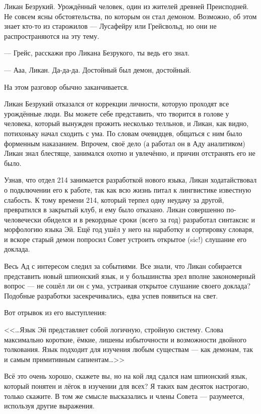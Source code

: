 \documentclass[a4paper,10pt]{book}
\begin{document}
Ликан Безрукий. Урождённый человек, один из жителей древней Преисподней. Не 
совсем ясны обстоятельства, по которым он стал демоном. Возможно, об этом знает 
кто-то из старожилов --- Лусафейру или Грейсвольд, но они не распространяются 
на эту тему.

--- Грейс, расскажи про Ликана Безрукого, ты ведь его знал.

--- Ааа, Ликан. Да-да-да. Достойный был демон, достойный.

На этом разговор обычно заканчивается.

Ликан Безрукий отказался от коррекции личности, которую проходят все урождённые 
люди. Вы можете себе представить, что творится в голове у человека, который 
вынужден прожить несколько телльнов, и Ликан, как видно, потихоньку начал 
сходить с ума. По словам очевидцев, общаться с ним было форменным наказанием. 
Впрочем, своё дело (а работал он в Аду аналитиком) Ликан знал блестяще, 
занимался охотно и увлечённо, и причин отстранять его не было.

Узнав, что отдел 214 занимается разработкой нового языка, Ликан ходатайствовал 
о подключении его к работе, так как всю жизнь питал к лингвистике известную 
слабость. К тому времени 214, который терпел одну неудачу за другой, 
превратился в закрытый клуб, и ему было отказано. Ликан совершенно 
по-человечески обиделся и в рекордные сроки (всего за год) разработал синтаксис 
и морфологию языка Эй. Ещё год ушёл у него на наработку и сортировку словаря, и 
вскоре старый демон попросил Совет устроить открытое (sic!) слушание его 
доклада.

Весь Ад с интересом следил за событиями. Все знали, что Ликан собирается 
представить новый шпионский язык, и у большинства зрел вполне закономерный 
вопрос --- не сошёл ли он с ума, устраивая открытое слушание своего доклада? 
Подобные разработки засекречивались, едва успев появиться на свет.

Вот отрывок из его выступления:

<<\dots Язык Эй представляет собой логичную, стройную систему. Слова 
максимально 
короткие, ёмкие, лишены избыточности и возможности двойного толкования. Язык 
подходит для изучения любым существам --- как демонам, так и самым примитивным 
сапиентам\dots>>

Всё это очень хорошо, скажете вы, но на кой ляд сдался нам шпионский язык, 
который понятен и лёгок в изучении для всех? Я таких вам десяток настрогаю, 
только скажите. В том же смысле высказались и члены Совета --- разумеется, 
используя другие выражения.
\end{document}
